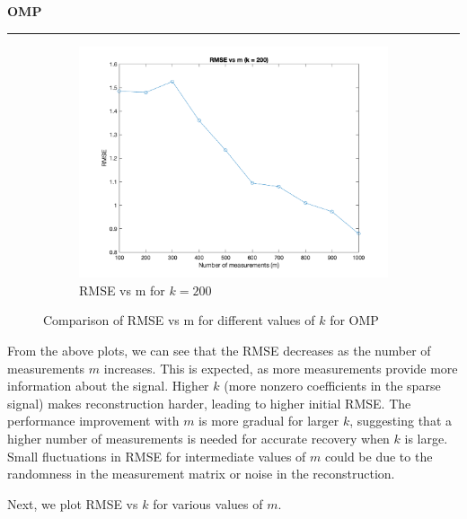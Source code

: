 \documentclass[a4paper,12pt]{article}
\newenvironment{solution}[2][]{%
    \begin{mdframed}[linecolor=blue!70!black, linewidth=2pt, roundcorner=10pt, backgroundcolor=yellow!10!white, skipabove=12pt, skipbelow=12pt]%
        \textbf{\large #2}
        \par\noindent\rule{\textwidth}{0.4pt}
}{
    \end{mdframed}
}
\begin{document}
\begin{solution}{OMP}
\begin{figure}[H]
\begin{subfigure}[t]{0.32\textwidth}
      \centering
      \includegraphics[width=\textwidth]{../images/omp/RMSE_vs_m_k_200.png}
      \caption{RMSE vs m for $k = 200$}
  \end{subfigure}
  \caption{Comparison of RMSE vs m for different values of $k$ for OMP}
  \label{fig:rmse_comparison}
\end{figure}

From the above plots, we can see that the RMSE decreases as the number of measurements $m$ increases. This is expected, as more measurements provide more information about the signal. Higher $k$ (more nonzero coefficients in the sparse signal) makes reconstruction harder, leading to higher initial RMSE. The performance improvement with $m$ is more gradual for larger $k$, suggesting that a higher number of measurements is needed for accurate recovery when $k$ is large. Small fluctuations in RMSE for intermediate values of $m$ could be due to the randomness in the measurement matrix or noise in the reconstruction.

Next, we plot RMSE vs $k$ for various values of $m$.


\end{solution}
\end{document}
